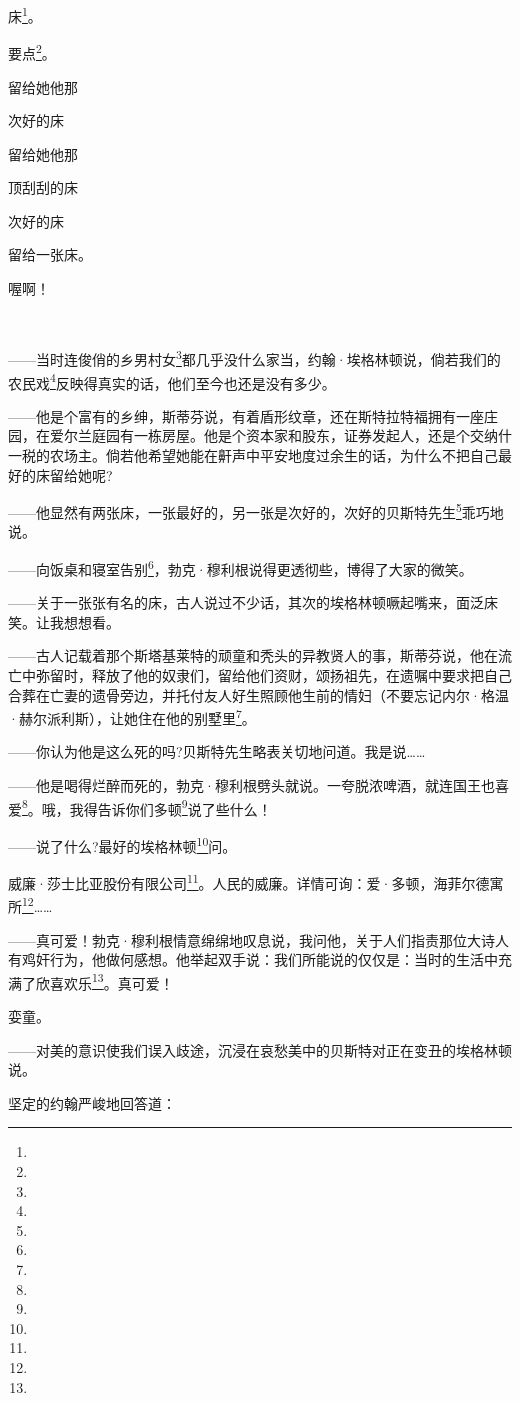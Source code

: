 \par 床\footnote{}。
\par 要点\footnote{}。
\par 留给她他那
\par 次好的床
\par 留给她他那
\par 顶刮刮的床
\par 次好的床
\par 留给一张床。
\par 喔啊！
\par  
\par ——当时连俊俏的乡男村女\footnote{}都几乎没什么家当，约翰·埃格林顿说，倘若我们的农民戏\footnote{}反映得真实的话，他们至今也还是没有多少。
\par ——他是个富有的乡绅，斯蒂芬说，有着盾形纹章，还在斯特拉特福拥有一座庄园，在爱尔兰庭园有一栋房屋。他是个资本家和股东，证券发起人，还是个交纳什一税的农场主。倘若他希望她能在鼾声中平安地度过余生的话，为什么不把自己最好的床留给她呢?
\par ——他显然有两张床，一张最好的，另一张是次好的，次好的贝斯特先生\footnote{}乖巧地说。
\par ——向饭桌和寝室告别\footnote{}，勃克·穆利根说得更透彻些，博得了大家的微笑。
\par ——关于一张张有名的床，古人说过不少话，其次的埃格林顿噘起嘴来，面泛床笑。让我想想看。
\par ——古人记载着那个斯塔基莱特的顽童和秃头的异教贤人的事，斯蒂芬说，他在流亡中弥留时，释放了他的奴隶们，留给他们资财，颂扬祖先，在遗嘱中要求把自己合葬在亡妻的遗骨旁边，并托付友人好生照顾他生前的情妇（不要忘记内尔·格温·赫尔派利斯），让她住在他的别墅里\footnote{}。
\par ——你认为他是这么死的吗?贝斯特先生略表关切地问道。我是说……
\par ——他是喝得烂醉而死的，勃克·穆利根劈头就说。一夸脱浓啤酒，就连国王也喜爱\footnote{}。哦，我得告诉你们多顿\footnote{}说了些什么！
\par ——说了什么?最好的埃格林顿\footnote{}问。
\par 威廉·莎士比亚股份有限公司\footnote{}。人民的威廉。详情可询：爱·多顿，海菲尔德寓所\footnote{}……
\par ——真可爱！勃克·穆利根情意绵绵地叹息说，我问他，关于人们指责那位大诗人有鸡奸行为，他做何感想。他举起双手说：我们所能说的仅仅是：当时的生活中充满了欣喜欢乐\footnote{}。真可爱！
\par 娈童。
\par ——对美的意识使我们误入歧途，沉浸在哀愁美中的贝斯特对正在变丑的埃格林顿说。
\par 坚定的约翰严峻地回答道：
